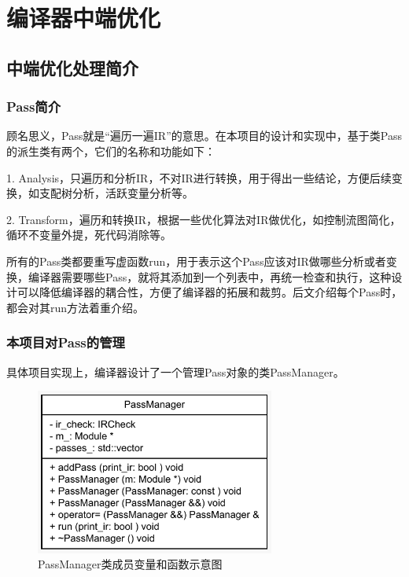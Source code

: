 
\chapter{编译器中端优化}
\section{中端优化处理简介}
\subsection{Pass简介}

顾名思义，Pass就是“遍历一遍IR”的意思。在本项目的设计和实现中，基于类Pass的派生类有两个，它们的名称和功能如下：

1. Analysis，只遍历和分析IR，不对IR进行转换，用于得出一些结论，方便后续变换，如支配树分析，活跃变量分析等。

2. Transform，遍历和转换IR，根据一些优化算法对IR做优化，如控制流图简化，循环不变量外提，死代码消除等。

所有的Pass类都要重写虚函数run，用于表示这个Pass应该对IR做哪些分析或者变换，编译器需要哪些Pass，就将其添加到一个列表中，再统一检查和执行，这种设计可以降低编译器的耦合性，方便了编译器的拓展和裁剪。后文介绍每个Pass时，都会对其run方法着重介绍。

\subsection{本项目对Pass的管理}

具体项目实现上，编译器设计了一个管理Pass对象的类PassManager。

\begin{figure}[htb]
  \centering
  \includegraphics[width=0.7\textwidth]{figures/PassManagerUML.pdf}
  \caption{PassManager类成员变量和函数示意图}
  \label{fig:passMnager}
\end{figure}

